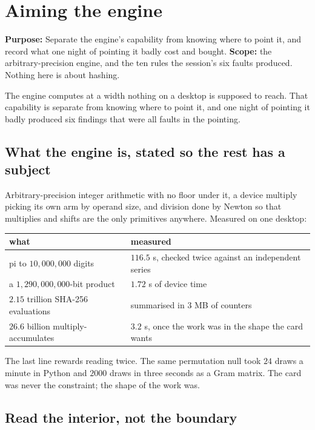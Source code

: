 \chapter{Aiming the engine}

\textbf{Purpose:} Separate the engine's capability from knowing where to point it, and record what one night of pointing it badly cost and bought. \textbf{Scope:} the arbitrary-precision engine, and the ten rules the session's six faults produced. Nothing here is about hashing.

The engine computes at a width nothing on a desktop is supposed to reach. That capability is separate from knowing where to point it, and one night of pointing it badly produced six findings that were all faults in the pointing.

\section{What the engine is, stated so the rest has a subject}

Arbitrary-precision integer arithmetic with no floor under it, a device multiply picking its own arm by operand size, and division done by Newton so that multiplies and shifts are the only primitives anywhere. Measured on one desktop:

\begin{center}
\begin{tabular}{@{}ll@{}}
\toprule
what & measured \\
\midrule
pi to \(10{,}000{,}000\) digits & \(116.5\) s, checked twice against an independent series \\
a \(1{,}290{,}000{,}000\)-bit product & \(1.72\) s of device time \\
\(2.15\) trillion SHA-256 evaluations & summarised in \(3\) MB of counters \\
\(26.6\) billion multiply-accumulates & \(3.2\) s, once the work was in the shape the card wants \\
\bottomrule
\end{tabular}
\end{center}

The last line rewards reading twice. The same permutation null took \(24\) draws a minute in Python and \(2000\) draws in three seconds as a Gram matrix. The card was never the constraint; the shape of the work was.

\section{Read the interior, not the boundary}

